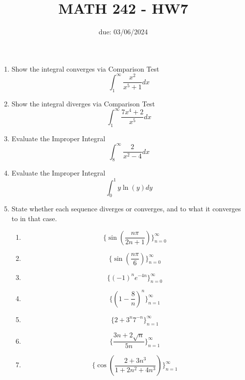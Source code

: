 \documentclass[12pt]{article}
\title{MATH 242 - HW7}
\date{due: 03/06/2024}
\begin{document}
\maketitle

\begin{enumerate}

\item Show the integral converges via Comparison Test
$$\int_1^{\infty}\frac{x^2}{x^5+1}dx$$
\vfill
\item Show the integral diverges via Comparison Test
$$\int_1^{\infty}\frac{7x^4+2}{x^5}dx$$
\vfill
\newpage
\item Evaluate the Improper Integral
$$\int_8^{\infty}\frac{2}{x^2-4}dx$$
\vfill
\item Evaluate the Improper Integral
$$\int_0^{1}y\ln(y)dy$$
\vfill
\newpage
\item State whether each sequence diverges or converges, and to what it converges to in that case.
\begin{enumerate}
    \item $$\{\sin(\frac{n\pi}{2n+1})\}_{n=0}^{\infty}$$
    \vfill
    \item $$\{\sin(\frac{n\pi}{6})\}_{n=0}^{\infty}$$
    \vfill
    \item $$\{(-1)^ne^{-4n}\}_{n=0}^{\infty}$$
    \vfill
    \item $$\{(1-\frac{8}{n})^n\}_{n=1}^{\infty}$$
    \vfill
    \newpage
    \item $$\{2+3^n7^{-n}\}_{n=1}^{\infty}$$
    \vfill
    \item $$\{\frac{3n+2\sqrt{n}}{5n}\}_{n=1}^{\infty}$$
    \vfill
    \item $$\{\cos(\frac{2+3n^3}{1+2n^2+4n^3})\}_{n=1}^{\infty}$$
    \vfill
\end{enumerate}
\end{enumerate}
\end{document}
